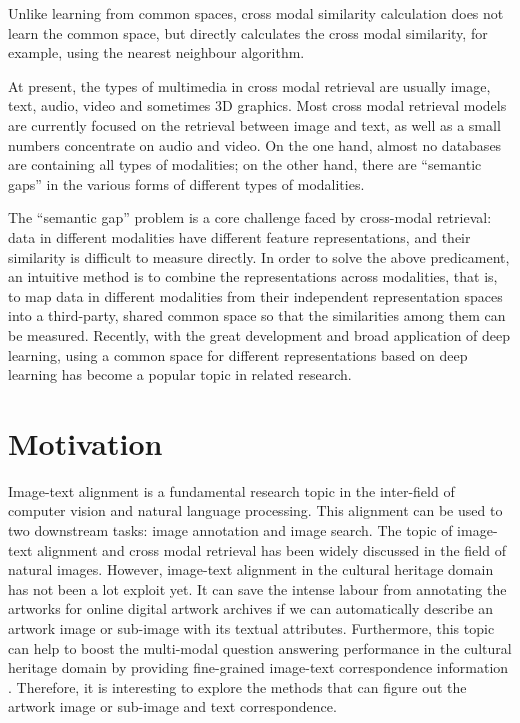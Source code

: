 Unlike learning from common spaces, cross modal similarity calculation does not learn the common space, but directly calculates the cross modal similarity, for example, using the nearest neighbour algorithm.

At present, the types of multimedia in cross modal retrieval are usually image, text, audio, video and sometimes 3D graphics. Most cross modal retrieval models are currently focused on the retrieval between image and text, as well as a small numbers concentrate on audio and video. On the one hand, almost no databases are containing all types of modalities; on the other hand, there are ``semantic gaps'' in the various forms of different types of modalities.

The ``semantic gap'' problem is a core challenge faced by cross-modal retrieval: data in different modalities have different feature representations, and their similarity is difficult to measure directly. In order to solve the above predicament, an intuitive method is to combine the representations across modalities, that is, to map data in different modalities from their independent representation spaces into a third-party, shared common space so that the similarities among them can be measured. Recently, with the great development and broad application of deep learning, using a common space for different representations based on deep learning has become a popular topic in related research.

\section{Motivation}
Image-text alignment is a fundamental research topic in the inter-field of computer vision and natural language processing. This alignment can be used to two downstream tasks: image annotation and image search. The topic of image-text alignment and cross modal retrieval has been widely discussed in the field of natural images. However, image-text alignment in the cultural heritage domain has not been a lot exploit yet. It can save the intense labour from annotating the artworks for online digital artwork archives if we can automatically describe an artwork image or sub-image with its textual attributes. Furthermore, this topic can help to boost the multi-modal question answering performance in the cultural heritage domain by providing fine-grained image-text correspondence information \cite{mqa}. Therefore, it is interesting to explore the methods that can figure out the artwork image or sub-image and text correspondence.

